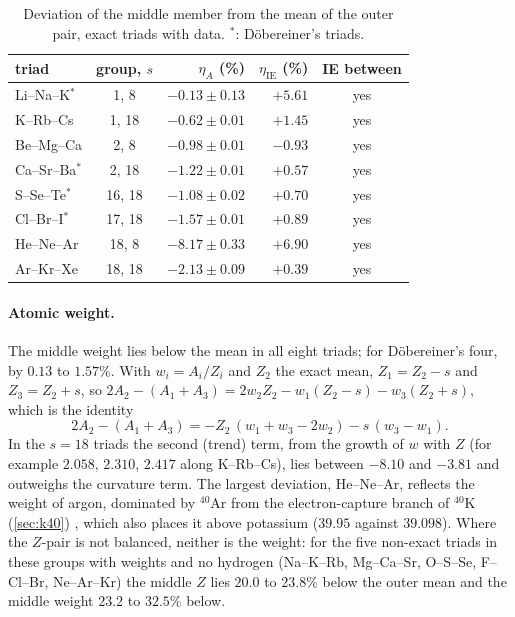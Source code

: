\documentclass[11pt]{article}
\theoremstyle{definition}\newtheorem{definition}[theorem]{Definition}
\theoremstyle{remark}\newtheorem{remark}[theorem]{Remark}
\begin{document}
\begin{table}[htbp]\centering
\caption{Deviation of the middle member from the mean of the outer pair, exact triads with data. $^*$: D\"obereiner's triads.}\label{tab:dev}
\small
\begin{tabular}{@{}lcrrc@{}}\toprule
triad & group, $s$ & $\eta_A$ (\%) & $\eta_{\mathrm{IE}}$ (\%) & IE between\\\midrule
Li--Na--K$^*$ & 1, 8 & $-0.13\pm0.13$ & $+5.61$ & yes\\
K--Rb--Cs & 1, 18 & $-0.62\pm0.01$ & $+1.45$ & yes\\
Be--Mg--Ca & 2, 8 & $-0.98\pm0.01$ & $-0.93$ & yes\\
Ca--Sr--Ba$^*$ & 2, 18 & $-1.22\pm0.01$ & $+0.57$ & yes\\
S--Se--Te$^*$ & 16, 18 & $-1.08\pm0.02$ & $+0.70$ & yes\\
Cl--Br--I$^*$ & 17, 18 & $-1.57\pm0.01$ & $+0.89$ & yes\\
He--Ne--Ar & 18, 8 & $-8.17\pm0.33$ & $+6.90$ & yes\\
Ar--Kr--Xe & 18, 18 & $-2.13\pm0.09$ & $+0.39$ & yes\\\bottomrule
\end{tabular}
\end{table}

\paragraph{Atomic weight.} The middle weight lies below the mean in all eight triads; for D\"obereiner's four, by $0.13$ to $1.57\%$. With $w_i=A_i/Z_i$ and $Z_2$ the exact mean, $Z_1=Z_2-s$ and $Z_3=Z_2+s$, so $2A_2-(A_1+A_3)=2w_2Z_2-w_1(Z_2-s)-w_3(Z_2+s)$, which is the identity
\[
2A_2-(A_1+A_3)=-Z_2\,(w_1+w_3-2w_2)-s\,(w_3-w_1).
\]
In the $s=18$ triads the second (trend) term, from the growth of $w$ with $Z$ (for example $2.058$, $2.310$, $2.417$ along K--Rb--Cs), lies between $-8.10$ and $-3.81$ and outweighs the curvature term. The largest deviation, He--Ne--Ar, reflects the weight of argon, dominated by $^{40}$Ar from the electron-capture branch of $^{40}$K (\cref{sec:k40}) \cite{GE}, which also places it above potassium ($39.95$ against $39.098$). Where the $Z$-pair is not balanced, neither is the weight: for the five non-exact triads in these groups with weights and no hydrogen (Na--K--Rb, Mg--Ca--Sr, O--S--Se, F--Cl--Br, Ne--Ar--Kr) the middle $Z$ lies $20.0$ to $23.8\%$ below the outer mean and the middle weight $23.2$ to $32.5\%$ below.
\end{document}
